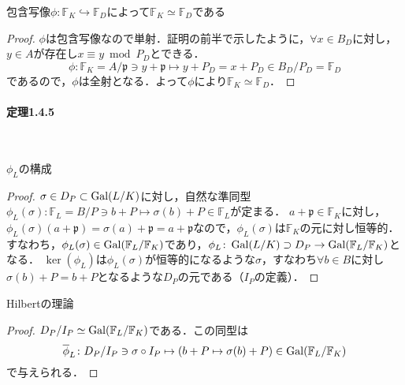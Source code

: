 \begin{screen}
  包含写像$\phi\colon \mathbb{F}_K\hookrightarrow\mathbb{F}_D$によって$\mathbb{F}_K\simeq\mathbb{F}_D$である
\end{screen}
\begin{proof}
  $\phi$は包含写像なので単射．証明の前半で示したように，$\forall x\in B_D$に対し，$y\in A$が存在し$x\equiv y\bmod P_D$とできる．
  \[\phi\colon \mathbb{F}_K = A/\mathfrak{p}\ni y + \mathfrak{p}\mapsto y + P_D = x + P_D\in B_D/P_D = \mathbb{F}_D\]
  であるので，$\phi$は全射となる．よって$\phi$により$\mathbb{F}_K\simeq\mathbb{F}_D$．
\end{proof}

\paragraph{定理1.4.5}~
\begin{screen}
  $\phi_L$の構成
\end{screen}
\begin{proof}
  $\sigma\in D_P\subset\operatorname{Gal}(L/K)$に対し，自然な準同型$\phi_L(\sigma)\colon\mathbb{F}_L = B/P\ni b + P\mapsto\sigma(b) + P\in\mathbb{F}_L$が定まる．
  $a + \mathfrak{p}\in\mathbb{F}_K$に対し，$\phi_L(\sigma)(a + \mathfrak{p}) = \sigma(a) + \mathfrak{p} = a + \mathfrak{p}$なので，$\phi_L(\sigma)$は$\mathbb{F}_K$の元に対し恒等的．
  すなわち，$\phi_L(\sigma)\in\operatorname{Gal}(\mathbb{F}_L/\mathbb{F}_K)$であり，$\phi_L\colon\operatorname{Gal}(L/K)\supset D_P\to\operatorname{Gal}(\mathbb{F}_L/\mathbb{F}_K)$となる．
  $\ker(\phi_L)$は$\phi_L(\sigma)$が恒等的になるような$\sigma$，すなわち$\forall b\in B$に対し$\sigma(b) + P = b + P$となるような$D_P$の元である（$I_P$の定義）．
\end{proof}

\begin{screen}
  Hilbertの理論
\end{screen}
\begin{proof}
  $D_P/I_P\simeq\operatorname{Gal}(\mathbb{F}_L/\mathbb{F}_K)$である．この同型は
  \[\overline{\phi}_L\colon D_P/I_P\ni\sigma \circ I_P\mapsto (b + P\mapsto\sigma(b) + P) \in \operatorname{Gal}(\mathbb{F}_L/\mathbb{F}_K)\]
  で与えられる．
\end{proof}

